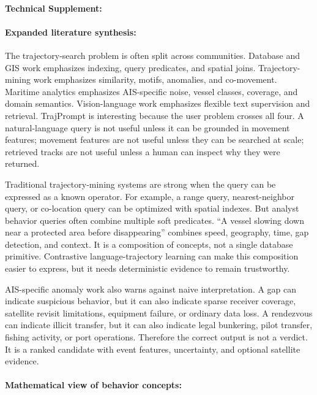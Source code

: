 \documentclass{article}
\begin{document}
\paragraph{Technical Supplement:}

\paragraph{Expanded literature synthesis:}

The trajectory-search problem is often split across communities. Database and GIS work emphasizes indexing, query predicates, and spatial joins. Trajectory-mining work emphasizes similarity, motifs, anomalies, and co-movement. Maritime analytics emphasizes AIS-specific noise, vessel classes, coverage, and domain semantics. Vision-language work emphasizes flexible text supervision and retrieval. TrajPrompt is interesting because the user problem crosses all four. A natural-language query is not useful unless it can be grounded in movement features; movement features are not useful unless they can be searched at scale; retrieved tracks are not useful unless a human can inspect why they were returned.

Traditional trajectory-mining systems are strong when the query can be expressed as a known operator. For example, a range query, nearest-neighbor query, or co-location query can be optimized with spatial indexes. But analyst behavior queries often combine multiple soft predicates. ``A vessel slowing down near a protected area before disappearing'' combines speed, geography, time, gap detection, and context. It is a composition of concepts, not a single database primitive. Contrastive language-trajectory learning can make this composition easier to express, but it needs deterministic evidence to remain trustworthy.

AIS-specific anomaly work also warns against naive interpretation. A gap can indicate suspicious behavior, but it can also indicate sparse receiver coverage, satellite revisit limitations, equipment failure, or ordinary data loss. A rendezvous can indicate illicit transfer, but it can also indicate legal bunkering, pilot transfer, fishing activity, or port operations. Therefore the correct output is not a verdict. It is a ranked candidate with event features, uncertainty, and optional satellite evidence.

\paragraph{Mathematical view of behavior concepts:}
\end{document}
